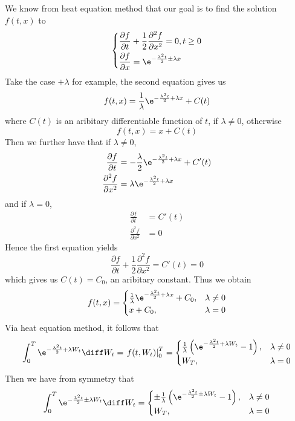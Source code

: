    \begin{subproblem}[(\alph*)]
        \item
        We know from heat equation method that
        our goal is to find the solution $f(t,x)$ to
        \[\left\{\begin{aligned}
            &\frac{\partial f}{\partial t}+\frac{1}{2}\frac{\partial^2 f}{\partial x^2}=0,t\geq 0\\
            &\frac{\partial f}{\partial x}=\e^{-\frac{\lambda^2t}{2}\pm\lambda x}\\
        \end{aligned}\right.\]
        Take the case $+\lambda$ for example, the second equation gives
        us
        \[f(t,x)=\frac{1}{\lambda}\e^{-\frac{\lambda^2t}{2}+\lambda x}+C(t)\]
        where $C(t)$ is an aribitary differentiable function of $t$, if $\lambda\neq 0$, otherwise
        \[f(t,x)=x+C(t)\]
        Then we further have that if $\lambda\neq 0$,
        \[\begin{aligned}
            \frac{\partial f}{\partial t}
            &=-\frac{\lambda}{2}\e^{-\frac{\lambda^2t}{2}+\lambda x}+C'(t)\\
            \frac{\partial^2 f}{\partial x^2}
            &=\lambda\e^{-\frac{\lambda^2t}{2}+\lambda x}
        \end{aligned}\]
        and if $\lambda=0$,
        \[\begin{aligned}
            \frac{\partial f}{\partial t}
            &=C'(t)\\
            \frac{\partial^2 f}{\partial x^2}
            &=0
        \end{aligned}\]
        Hence the first equation yields
        \[\frac{\partial f}{\partial t}+\frac{1}{2}\frac{\partial^2 f}{\partial x^2}
        =C'(t)=0\]
        which gives us $C(t)=C_0$, an aribitary constant.
        Thus we obtain
        \[f(t,x)=\begin{cases}
            \frac{1}{\lambda}\e^{-\frac{\lambda^2t}{2}+\lambda x}+C_0,&\lambda\neq 0\\
            x+C_0,&\lambda=0
        \end{cases}\]
        Via heat equation method, it follows that
        \[\int_0^T\e^{-\frac{\lambda^2t}{2}+\lambda W_t}\diff W_t
        =\left.f(t,W_t)\right|_0^T
        =\begin{cases}
        \frac{1}{\lambda}\left(\e^{-\frac{\lambda^2t}{2}+\lambda W_t}-1\right),&\lambda\neq 0\\
        W_T,&\lambda=0
        \end{cases}\]
        Then we have from symmetry that
        \[\int_0^T\e^{-\frac{\lambda^2t}{2}\pm\lambda W_t}\diff W_t
        =\begin{cases}
        \pm\frac{1}{\lambda}\left(\e^{-\frac{\lambda^2t}{2}\pm\lambda W_t}-1\right),&\lambda\neq 0\\
        W_T,&\lambda=0
        \end{cases}\]
        

\end{subproblem}
